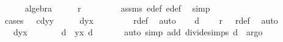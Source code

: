 \begin{isabellebody}
\ \ \ \ \isamarkupfalse%
\ algebra\isanewline
\ \ \isamarkupfalse%
\ \isamarkupfalse%
\ {\isachardoublequoteopen}r\ {\isacharequal}\ {}{\isachardoublequoteclose}\ \isanewline
\ \ \ \ \isamarkupfalse%
\ assms\ e{}{\isacharunderscore}def\ e{}{\isacharunderscore}def\ \isamarkupfalse%
\ simp\isanewline
\ \ \isamarkupfalse%
\ \isamarkupfalse%
\ cases{\isacharcolon}\ {\isachardoublequoteopen}{\isacharparenleft}{}\ {\isacharminus}\ c{\isacharasterisk}d{\isacharasterisk}y{}{\isacharcircum}{}{\isacharasterisk}y{}{\isacharcircum}{}{\isacharparenright}\ {\isacharequal}\ {}\ {\isasymor}\ {\isacharparenleft}{}\ {\isacharminus}\ d{\isacharasterisk}y{}{\isacharcircum}{}{\isacharasterisk}x{}{\isacharcircum}{}{\isacharparenright}\ {\isacharequal}\ {}{\isachardoublequoteclose}\ \isanewline
\ \ \ \ \isamarkupfalse%
\ r{\isacharunderscore}def\ \isamarkupfalse%
\ auto\isanewline
\ \ \isamarkupfalse%
\ {\isachardoublequoteopen}d\ {\isasymnoteq}\ {}{\isachardoublequoteclose}\ \isamarkupfalse%
\ {\isacartoucheopen}r\ {\isacharequal}\ {}{\isacartoucheclose}\ r{\isacharunderscore}def\ \isamarkupfalse%
\ auto\isanewline
\ \ \isacommand{{\isacharbraceleft}}\isamarkupfalse%
\isamarkupfalse%
\ {\isachardoublequoteopen}{\isacharparenleft}{}\ {\isacharminus}\ d{\isacharasterisk}y{}{\isacharcircum}{}{\isacharasterisk}x{}{\isacharcircum}{}{\isacharparenright}\ {\isacharequal}\ {}{\isachardoublequoteclose}\isanewline
\ \ \isamarkupfalse%
\ \isamarkupfalse%
\ {\isachardoublequoteopen}{}{\isacharslash}d\ {\isacharequal}\ y{}{\isacharcircum}{}{\isacharasterisk}x{}{\isacharcircum}{}{\isachardoublequoteclose}\ {\isachardoublequoteopen}{}{\isacharslash}d\ {\isasymnoteq}\ {}{\isachardoublequoteclose}\isanewline
\ \ \ \ \isamarkupfalse%
{\isacharparenleft}auto\ simp\ add{\isacharcolon}\ divide{\isacharunderscore}simps\ {\isacartoucheopen}d\ {\isasymnoteq}\ {}{\isacartoucheclose}{\isacharcomma}argo{\isacharparenright}\isacommand{{\isacharbraceright}}\isamarkupfalse%
\isanewline

\end{isabellebody}
